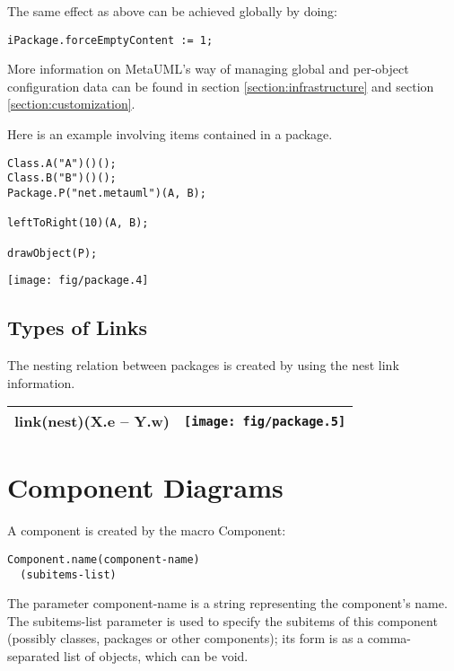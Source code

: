 \documentclass{article}
\newcommand{\code}{\ttfamily}
\begin{document}
The same effect as above can be achieved globally by doing:

\begin{verbatim}
iPackage.forceEmptyContent := 1;
\end{verbatim}

More information on MetaUML's way of managing global and per-object configuration data can be found in
section \ref{section:infrastructure} and section \ref{section:customization}.

Here is an example involving items contained in a package.

\begin{multicols}{2}
\begin{verbatim}
Class.A("A")()();
Class.B("B")()();
Package.P("net.metauml")(A, B);

leftToRight(10)(A, B);

drawObject(P);
\end{verbatim}
\columnbreak
\hspace{3cm}\texttt{[image: fig/package.4]}
\end{multicols}

\subsection{Types of Links}

The nesting relation between packages is created by using the {\code nest} link information.

\begin{tabular}{||l|c||}
\hline
{\code link(nest)(X.e -- Y.w)} & \texttt{[image: fig/package.5]} \\
\hline
\end{tabular}

\section{Component Diagrams}

A component is created by the macro {\code Component}:

\begin{verbatim}
Component.name(component-name)
  (subitems-list)
\end{verbatim}

The parameter {\code component-name} is a string representing the component's name. The {\code subitems-list} parameter
is used to specify the subitems of this component (possibly classes, packages or other components); its form is as a 
comma-separated list of objects, which can be void.
\end{document}
